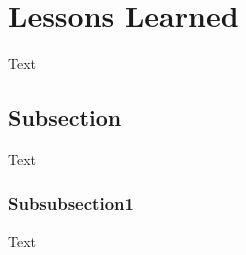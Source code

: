 \section{Lessons Learned}\label{sec:lessons_learned}
Text

\subsection{Subsection}
Text
\subsubsection{Subsubsection1}
Text

